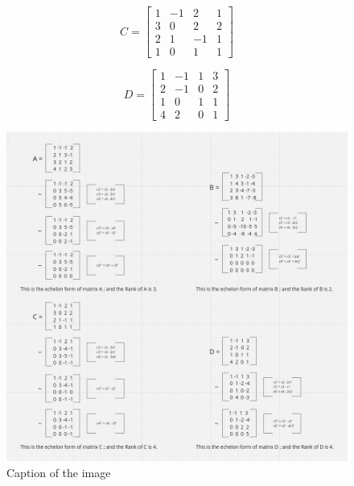 \documentclass{article}
\begin{document}
    \begin{center}
    \begin{minipage}{0.45\textwidth}
    \[ C = \begin{bmatrix} 1 & -1 & 2 & 1 \\ 3 & 0 & 2 & 2 \\ 2 & 1 & -1 & 1 \\ 1 & 0 & 1 & 1 \end{bmatrix} \]
    \end{minipage}
    \hspace{0.05\textwidth}
    \begin{minipage}{0.45\textwidth}
    \[ D = \begin{bmatrix} 1 & -1 & 1 & 3 \\ 2 & -1 & 0 & 2 \\ 1 & 0 & 1 & 1 \\ 4 & 2 & 0 & 1 \end{bmatrix} \]
    \end{minipage}
    \end{center}

    \vspace{120pt}

    \begin{figure}[htbp]
        \centering
        \includegraphics[width=1.2\textwidth, height=.95\textheight]{../asset/rankOfExc.png}
        \caption{Caption of the image}
        \label{fig:example}
    \end{figure}
    
\end{document}
